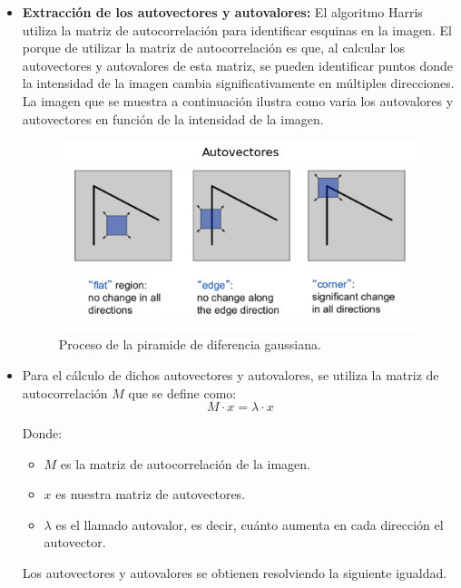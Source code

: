 \documentclass[a4paper]{article}
\begin{document}
  \begin{itemize}
      \item \textbf{Extracción de los autovectores y autovalores:}  
      El algoritmo Harris utiliza la matriz de autocorrelación para identificar esquinas en la imagen. El porque 
      de utilizar la matriz de autocorrelación es que, al calcular los autovectores y autovalores de esta matriz, se pueden identificar puntos donde la intensidad de la imagen cambia significativamente en múltiples direcciones.
      La imagen que se muestra a continuación ilustra como varia los autovalores y autovectores en función de la intensidad de la imagen.
      \begin{figure}[H]
        \centering
        \includegraphics[width=1.1\textwidth]{images/harris_autovectores.png}
        \caption{Proceso de la piramide de diferencia gaussiana.}
        
    \end{figure}
      
    \item Para el cálculo de dichos autovectores y autovalores, se utiliza la matriz de autocorrelación \(M\) que se define como:
    \[
        M \cdot x = \lambda \cdot x
    \]
    
    Donde:
    \begin{itemize}
        \item \(M\) es la matriz de autocorrelación de la imagen.
        \item \(x\) es nuestra matriz de autovectores.
        \item \(\lambda\) es el llamado autovalor, es decir, cuánto aumenta en cada dirección el autovector.
    \end{itemize}

    Los autovectores y autovalores se obtienen resolviendo la siguiente igualdad.
    

\end{itemize}
\end{document}
